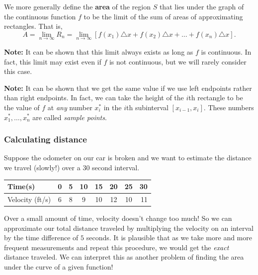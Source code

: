 \documentclass[t]{beamer}
\theoremstyle{plain}
\theoremstyle{definition}
\begin{document}
\begin{frame}
\noindent We more generally define the \textbf{area} of the region $S$ that lies under the graph of the continuous function $f$ to be the limit of the sum of areas of approximating rectangles.  That is,
\[ A = \lim_{n\rightarrow \infty} R_{n} = \lim_{n\rightarrow \infty}[f(x_{1})\triangle x + f(x_{2})\triangle x + \ldots + f(x_{n})\triangle x].\]\pause

\smallskip

\noindent \textbf{Note:} It can be shown that this limit always exists as long as $f$ is continuous.  In fact, this limit may exist even if $f$ is not continuous, but we will rarely consider this case.\pause

\medskip

\noindent \textbf{Note:} It can be shown that we get the same value if we use left endpoints rather than right endpoints.  In fact, we can take the height of the $i$th rectangle to be the value of $f$ at \emph{any} number $x_{i}^{*}$ in the $i$th subinterval $[x_{i-1}, x_{i}]$.  These numbers $x_{1}^{*},\ldots, x_{n}^{*}$ are called \emph{sample points}.
\end{frame}

\begin{frame}
\frametitle{Calculating distance}

\noindent Suppose the odometer on our car is broken and we want to estimate the distance we travel (slowly!) over a $30$ second interval.  \pause

\medskip

\begin{tabular}{l*{6}{c}r}
Time(s)            & 0 & 5 & 10 & 15 & 20  & 25 & 30 \\
\hline
Velocity (ft/s) & 6 & 8 & 9 & 10 & 12 & 10 & 11  \\
\end{tabular}\pause

\vfill
\noindent Over a small amount of time, velocity doesn't change too much!  So we can approximate our total distance traveled by multiplying the velocity on an interval by the time difference of $5$ seconds.  It is plausible that as we take more and more frequent measurements and repeat this procedure, we would get the \emph{exact} distance traveled.  We can interpret this as another problem of finding the area under the curve of a given function!
\end{frame}
\end{document}
